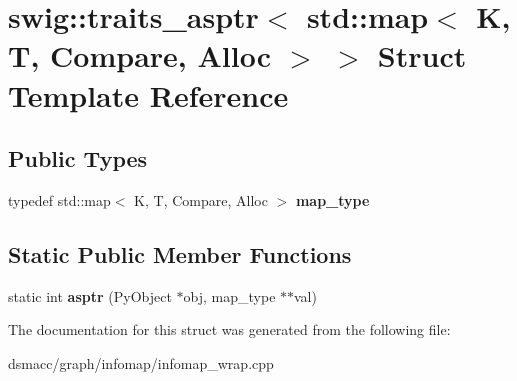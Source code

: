 \hypertarget{structswig_1_1traits__asptr_3_01std_1_1map_3_01K_00_01T_00_01Compare_00_01Alloc_01_4_01_4}{}\section{swig\+:\+:traits\+\_\+asptr$<$ std\+:\+:map$<$ K, T, Compare, Alloc $>$ $>$ Struct Template Reference}
\label{structswig_1_1traits__asptr_3_01std_1_1map_3_01K_00_01T_00_01Compare_00_01Alloc_01_4_01_4}
\subsection*{Public Types}
\begin{DoxyCompactItemize}
\item 
\mbox{\label{structswig_1_1traits__asptr_3_01std_1_1map_3_01K_00_01T_00_01Compare_00_01Alloc_01_4_01_4_a601c281ad9967eee64015c692cc41423}} 
typedef std\+::map$<$ K, T, Compare, Alloc $>$ {\bfseries map\+\_\+type}
\end{DoxyCompactItemize}
\subsection*{Static Public Member Functions}
\begin{DoxyCompactItemize}
\item 
\mbox{\label{structswig_1_1traits__asptr_3_01std_1_1map_3_01K_00_01T_00_01Compare_00_01Alloc_01_4_01_4_aee64fde1f08f8570c566c93075ef4f61}} 
static int {\bfseries asptr} (Py\+Object $\ast$obj, map\+\_\+type $\ast$$\ast$val)
\end{DoxyCompactItemize}


The documentation for this struct was generated from the following file\+:\begin{DoxyCompactItemize}
\item 
dsmacc/graph/infomap/infomap\+\_\+wrap.\+cpp\end{DoxyCompactItemize}
